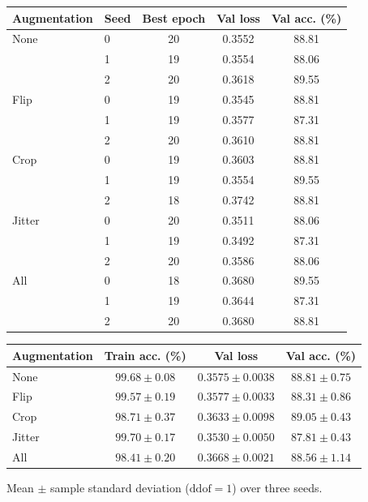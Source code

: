 \begin{center}
\begin{tabular}{llccc}
    \toprule
    Augmentation & Seed & Best epoch & Val loss & Val acc. (\%) \\
    \midrule
    None   & 0 & 20 & 0.3552 & 88.81 \\
           & 1 & 19 & 0.3554 & 88.06 \\
           & 2 & 20 & 0.3618 & 89.55 \\
    \midrule
    Flip   & 0 & 19 & 0.3545 & 88.81 \\
           & 1 & 19 & 0.3577 & 87.31 \\
           & 2 & 20 & 0.3610 & 88.81 \\
    \midrule
    Crop   & 0 & 19 & 0.3603 & 88.81 \\
           & 1 & 19 & 0.3554 & 89.55 \\
           & 2 & 18 & 0.3742 & 88.81 \\
    \midrule
    Jitter & 0 & 20 & 0.3511 & 88.06 \\
           & 1 & 19 & 0.3492 & 87.31 \\
           & 2 & 20 & 0.3586 & 88.06 \\
    \midrule
    All    & 0 & 18 & 0.3680 & 89.55 \\
           & 1 & 19 & 0.3644 & 87.31 \\
           & 2 & 20 & 0.3680 & 88.81 \\
    \bottomrule
\end{tabular}

\vspace{0.5em}
\begin{tabular}{lccc}
    \toprule
    Augmentation & Train acc. (\%) & Val loss & Val acc. (\%) \\
    \midrule
    None   & $99.68 \pm 0.08$ & $0.3575 \pm 0.0038$ & $88.81 \pm 0.75$ \\
    Flip   & $99.57 \pm 0.19$ & $0.3577 \pm 0.0033$ & $88.31 \pm 0.86$ \\
    Crop   & $98.71 \pm 0.37$ & $0.3633 \pm 0.0098$ & $89.05 \pm 0.43$ \\
    Jitter & $99.70 \pm 0.17$ & $0.3530 \pm 0.0050$ & $87.81 \pm 0.43$ \\
    All    & $98.41 \pm 0.20$ & $0.3668 \pm 0.0021$ & $88.56 \pm 1.14$ \\
    \bottomrule
\end{tabular}

{\small Mean $\pm$ sample standard deviation ($\mathrm{ddof}=1$) over three seeds.}
\end{center}

